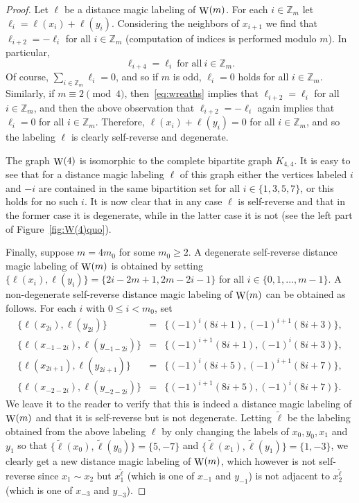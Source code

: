 \documentclass[11 pt,english]{article}
\newcommand{\ZZ}{\mathbb{Z}}
\newcommand{\Wr}{\mathop{\rm W}}
\theoremstyle{definition}
\begin{document}
\begin{proof}
Let $\ell$ be a distance magic labeling of $\Wr(m)$. For each $i \in \ZZ_m$ let $\ell_i = \ell(x_i) + \ell(y_i)$. Considering the neighbors of $x_{i+1}$ we find that $\ell_{i+2} = -\ell_{i}$ for all $i \in \ZZ_m$ (computation of indices is performed modulo $m$). In particular, 
\begin{equation}
\label{eq:wreaths}
	\ell_{i+4} = \ell_i\ \text{for all}\ i \in \ZZ_m.
\end{equation} 
Of course, $\sum_{i\in \ZZ_m}\ell_i = 0$, and so if $m$ is odd, $\ell_i = 0$ holds for all $i \in \ZZ_m$. Similarly, if $m \equiv 2 \pmod{4}$, then~\eqref{eq:wreaths} implies that $\ell_{i+2} = \ell_i$ for all $i \in \ZZ_m$, and then the above observation that $\ell_{i+2} = -\ell_i$ again implies that $\ell_i = 0$ for all $i \in \ZZ_m$. Therefore, $\ell(x_i) + \ell(y_i) = 0$ for all $i \in \ZZ_m$, and so the labeling $\ell$ is clearly self-reverse and degenerate.

The graph $\Wr(4)$ is isomorphic to the complete bipartite graph $K_{4,4}$. It is easy to see that for a distance magic labeling $\ell$ of this graph either the vertices labeled $i$ and $-i$ are contained in the same bipartition set for all $i \in \{1,3,5,7\}$, or this holds for no such $i$. It is now clear that in any case $\ell$ is self-reverse and that in the former case it is degenerate, while in the latter case it is not (see the left part of Figure~\ref{fig:W(4)quo}).

Finally, suppose $m = 4m_0$ for some $m_0 \geq 2$. A degenerate self-reverse distance magic labeling of $\Wr(m)$ is obtained by setting $\{\ell(x_i), \ell(y_i)\} = \{2i-2m+1, 2m-2i-1\}$ for all $i \in \{0,1,\ldots , m-1\}$. A non-degenerate self-reverse distance magic labeling of $\Wr(m)$ can be obtained as follows. For each $i$ with $0 \leq i < m_0$, set 
$$
	\begin{array}{ccl}
	\{\ell(x_{2i}), \ell(y_{2i})\} & = & \{(-1)^i (8i+1), (-1)^{i+1}(8i+3)\},\\
	\{\ell(x_{-1-2i}), \ell(y_{-1-2i})\} & = & \{(-1)^{i+1} (8i+1), (-1)^{i}(8i+3)\},\\
	\{\ell(x_{2i+1}), \ell(y_{2i+1})\} & = & \{(-1)^i (8i+5), (-1)^{i+1}(8i+7)\},\\
	\{\ell(x_{-2-2i}), \ell(y_{-2-2i})\} & = & \{(-1)^{i+1} (8i+5), (-1)^{i}(8i+7)\}.
	\end{array}
$$
We leave it to the reader to verify that this is indeed a distance magic labeling of $\Wr(m)$ and that it is self-reverse but is not degenerate. Letting $\tilde{\ell}$ be the labeling obtained from the above labeling $\ell$ by only changing the labels of $x_0, y_0, x_1$ and $y_1$ so that $\{\tilde{\ell}(x_0), \tilde{\ell}(y_0)\} = \{5,-7\}$ and $\{\tilde{\ell}(x_1), \tilde{\ell}(y_1)\} = \{1,-3\}$, we clearly get a new distance magic labeling of $\Wr(m)$, which however is not self-reverse since $x_1 \sim x_2$ but $x_1^{\tilde{\ell}}$ (which is one of $x_{-1}$ and $y_{-1}$) is not adjacent to $x_2^{\tilde{\ell}}$ (which is one of $x_{-3}$ and $y_{-3}$).
\end{proof}
\end{document}
